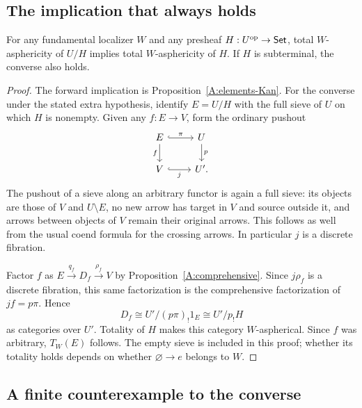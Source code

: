 \subsection{The implication that always holds}

\begin{proposition}\label{E:forward-subterminal}
For any fundamental localizer $W$ and any presheaf $H:U^{\mathrm{op}}\to\mathsf{Set}$, total $W$-asphericity of $U/H$ implies total $W$-asphericity of $H$. If $H$ is subterminal, the converse also holds.
\end{proposition}
\begin{proof}
The forward implication is Proposition~\ref{A:elements-Kan}. For the converse under the stated extra hypothesis, identify $E=U/H$ with the full sieve of $U$ on which $H$ is nonempty. Given any $f:E\to V$, form the ordinary pushout
\[
 \begin{tikzcd}
 E\arrow[r,hook,"\pi"]\arrow[d,"f"']&U\arrow[d,"p"]\\
 V\arrow[r,hook,"j"']&U'.
 \end{tikzcd}
\]
The pushout of a sieve along an arbitrary functor is again a full sieve: its objects are those of $V$ and $U\setminus E$, no new arrow has target in $V$ and source outside it, and arrows between objects of $V$ remain their original arrows. This follows as well from the usual coend formula for the crossing arrows. In particular $j$ is a discrete fibration.

Factor $f$ as $E\xrightarrow{q_f}D_f\xrightarrow{\rho_f}V$ by Proposition~\ref{A:comprehensive}. Since $j\rho_f$ is a discrete fibration, this same factorization is the comprehensive factorization of $jf=p\pi$. Hence
\[
 D_f\cong U'/(p\pi)_!1_E\cong U'/p_!H
\]
as categories over $U'$. Totality of $H$ makes this category $W$-aspherical. Since $f$ was arbitrary, $T_W(E)$ follows. The empty sieve is included in this proof; whether its totality holds depends on whether $\varnothing\to e$ belongs to $W$.
\end{proof}

\subsection{A finite counterexample to the converse}

